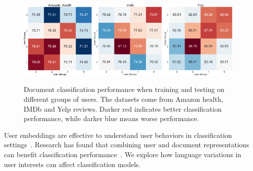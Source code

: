 \begin{figure}[t]
\centering
\includegraphics[width=0.325\textwidth]{./images/chapter4/uembedding/amazon_health_group.pdf}
\includegraphics[width=0.325\textwidth]{./images/chapter4/uembedding/imdb_group.pdf}
\includegraphics[width=0.325\textwidth]{./images/chapter4/uembedding/yelp_group.pdf}
\caption{Document classification performance when training and testing on different groups of users. The datasets come from Amazon health, IMDb and Yelp reviews. Darker red indicates better classification performance, while darker blue means worse performance.}
\label{chap4:fig:group}
\end{figure}

User embeddings are effective to understand user behaviors in classification settings~\cite{amir2016modelling, ding2018predicting}.
Research has found that combining user and document representations can benefit classification performance~\cite{yuan2019neural}.
We explore how language variations in user interests can affect classification models.

